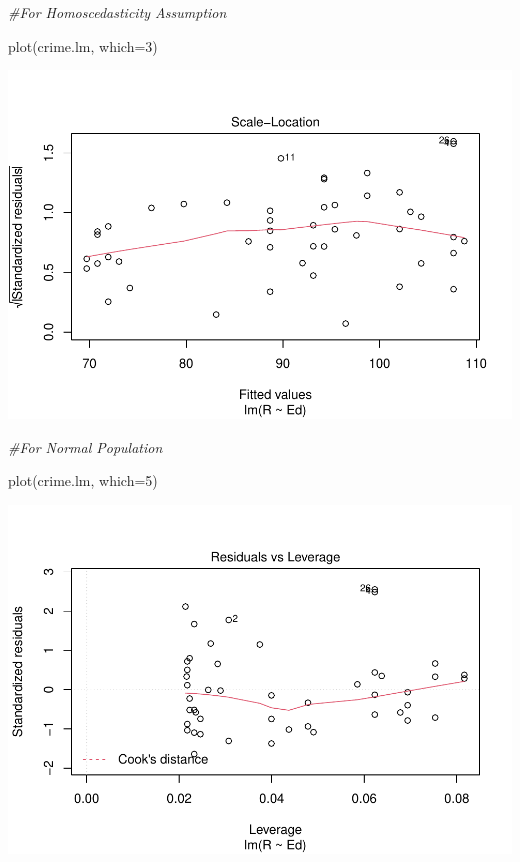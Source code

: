 \documentclass[
]{article}
\newenvironment{Shaded}{\begin{snugshade}}{\end{snugshade}}
\newcommand{\AttributeTok}[1]{\textcolor[rgb]{0.77,0.63,0.00}{#1}}
\newcommand{\CommentTok}[1]{\textcolor[rgb]{0.56,0.35,0.01}{\textit{#1}}}
\newcommand{\DecValTok}[1]{\textcolor[rgb]{0.00,0.00,0.81}{#1}}
\newcommand{\FunctionTok}[1]{\textcolor[rgb]{0.00,0.00,0.00}{#1}}
\newcommand{\NormalTok}[1]{#1}
\begin{document}
\begin{Shaded}
\begin{Highlighting}[]
\CommentTok{\#For Homoscedasticity Assumption}

\FunctionTok{plot}\NormalTok{(crime.lm, }\AttributeTok{which=}\DecValTok{3}\NormalTok{)}
\end{Highlighting}
\end{Shaded}

\includegraphics{Assignments_files/figure-latex/unnamed-chunk-33-4.pdf}

\begin{Shaded}
\begin{Highlighting}[]
\CommentTok{\#For Normal Population}

\FunctionTok{plot}\NormalTok{(crime.lm, }\AttributeTok{which=}\DecValTok{5}\NormalTok{)}
\end{Highlighting}
\end{Shaded}

\includegraphics{Assignments_files/figure-latex/unnamed-chunk-33-5.pdf}
\end{document}
